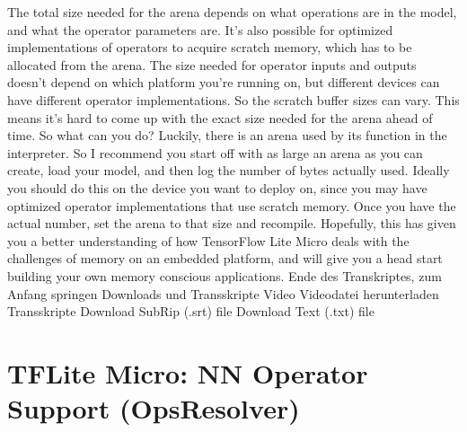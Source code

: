      The total size needed for the arena depends
     on what operations are in the model, and what the operator parameters are.
     It's also possible for optimized implementations of operators
     to acquire scratch memory, which has to be allocated from the arena.
     The size needed for operator inputs and outputs
     doesn't depend on which platform you're running on,
     but different devices can have different operator implementations.
     So the scratch buffer sizes can vary.
     This means it's hard to come up with the exact size needed
     for the arena ahead of time.
     So what can you do?
     Luckily, there is an arena used by its function in the interpreter.
     So I recommend you start off with as large an arena as you can create,
     load your model, and then log the number of bytes actually used.
     Ideally you should do this on the device you
     want to deploy on, since you may have optimized operator implementations that
     use scratch memory.
     Once you have the actual number, set the arena to that size and recompile.
     Hopefully, this has given you a better understanding
     of how TensorFlow Lite Micro deals with the challenges of memory
     on an embedded platform, and will give you a head start building
     your own memory conscious applications.
     Ende des Transkriptes, zum Anfang springen
     Downloads und Transskripte
     Video
     Videodatei herunterladen
     Transskripte
     Download SubRip (.srt) file
     Download Text (.txt) file   
 
 \section{TFLite Micro: NN Operator Support (OpsResolver)}
 
